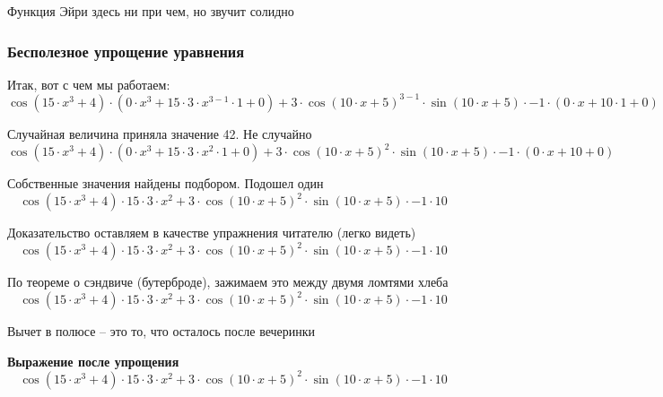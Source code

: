 \documentclass{article}
\begin{document}
Функция Эйри здесь ни при чем, но звучит солидно 
\subsubsection*{Бесполезное упрощение уравнения}

Итак, вот с чем мы работаем:\\
\begin{dmath*}
\cos(15 \cdot x^{3} + 4) \cdot (0 \cdot x^{3} + 15 \cdot 3 \cdot x^{3 - 1} \cdot 1 + 0) + 3 \cdot \cos(10 \cdot x + 5)^{3 - 1} \cdot \sin(10 \cdot x + 5) \cdot -1 \cdot (0 \cdot x + 10 \cdot 1 + 0)
\end{dmath*}


Случайная величина приняла значение 42. Не случайно 
\begin{dmath*}
\cos(15 \cdot x^{3} + 4) \cdot (0 \cdot x^{3} + 15 \cdot 3 \cdot x^{2} \cdot 1 + 0) + 3 \cdot \cos(10 \cdot x + 5)^{2} \cdot \sin(10 \cdot x + 5) \cdot -1 \cdot (0 \cdot x + 10 + 0)
\end{dmath*}


Собственные значения найдены подбором. Подошел один 
\begin{dmath*}
\cos(15 \cdot x^{3} + 4) \cdot 15 \cdot 3 \cdot x^{2} + 3 \cdot \cos(10 \cdot x + 5)^{2} \cdot \sin(10 \cdot x + 5) \cdot -1 \cdot 10
\end{dmath*}


Доказательство оставляем в качестве упражнения читателю (легко видеть) 
\begin{dmath*}
\cos(15 \cdot x^{3} + 4) \cdot 15 \cdot 3 \cdot x^{2} + 3 \cdot \cos(10 \cdot x + 5)^{2} \cdot \sin(10 \cdot x + 5) \cdot -1 \cdot 10
\end{dmath*}


По теореме о сэндвиче (бутерброде), зажимаем это между двумя ломтями хлеба 
\begin{dmath*}
\cos(15 \cdot x^{3} + 4) \cdot 15 \cdot 3 \cdot x^{2} + 3 \cdot \cos(10 \cdot x + 5)^{2} \cdot \sin(10 \cdot x + 5) \cdot -1 \cdot 10
\end{dmath*}


Вычет в полюсе – это то, что осталось после вечеринки 

\noindent\textbf{Выражение после упрощения}\\[4pt]
\begin{dmath*}
\cos(15 \cdot x^{3} + 4) \cdot 15 \cdot 3 \cdot x^{2} + 3 \cdot \cos(10 \cdot x + 5)^{2} \cdot \sin(10 \cdot x + 5) \cdot -1 \cdot 10
\end{dmath*}
\end{document}
